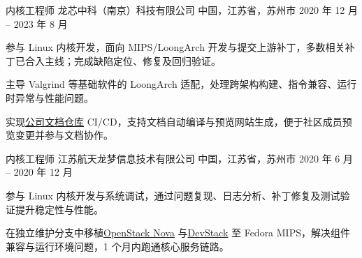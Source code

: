 

\begin{cventries}
\cventry
  {内核工程师}
  {龙芯中科（南京）科技有限公司}
  {中国，江苏省，苏州市}
  {2020 年 12 月 -- 2023 年 8 月}
  {
    \begin{cvitems}
      \item {参与 Linux 内核开发，面向 MIPS/LoongArch 开发与提交上游补丁，多数相关补丁已合入主线；完成缺陷定位、修复及回归验证。}
      \item {主导 Valgrind 等基础软件的 LoongArch 适配，处理跨架构构建、指令兼容、运行时异常与性能问题。}
      \item {实现\href{https://github.com/FreeFlyingSheep/LoongArch-Documentation}{公司文档仓库} CI/CD，支持文档自动编译与预览网站生成，便于社区成员预览变更并参与文档协作。}
    \end{cvitems}
  }

\cventry
  {内核工程师}
  {江苏航天龙梦信息技术有限公司}
  {中国，江苏省，苏州市}
  {2020 年 6 月 -- 2020 年 12 月}
  {
    \begin{cvitems}
      \item {参与 Linux 内核开发与系统调试，通过问题复现、日志分析、补丁修复及测试验证提升稳定性与性能。}
      \item {在独立维护分支中移植\href{https://github.com/FreeFlyingSheep/nova}{OpenStack Nova} 与\href{https://github.com/FreeFlyingSheep/devstack}{DevStack} 至 Fedora MIPS，解决组件兼容与运行环境问题，1 个月内跑通核心服务链路。}
    \end{cvitems}
  }

\end{cventries}
